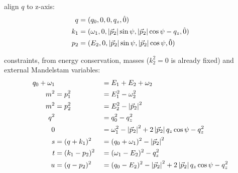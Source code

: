 align $q$ to z-axis:
\begin{align}
q &= (q_0,0,0,q_z,\hat 0)\\
k_1 &= (\omega_1,0,\left|\vec p_2\right|\sin\psi,\left|\vec p_2\right|\cos\psi-q_z, \hat 0)\\
p_2 &= (E_2,0,\left|\vec p_2\right|\sin\psi,\left|\vec p_2\right|\cos\psi, \hat 0)
\end{align}

constraints, from energy conservation, masses ($k_2^2 = 0$ is already fixed) and external Mandelstam variables:
\begin{align}
q_0+\omega_1 & &&=E_1+E_2+\omega_2 \label{eq:PSConIIMomCon}\\
m^2 &= p_1^2 &&= E_1^2 - \omega_2^2 \label{eq:PSConIIp1}\\
m^2 &= p_2^2 &&= E_2^2 - \left|\vec p_2\right|^2 \label{eq:PSConIIp2} \\
q^2 & &&= q_0^2 - q_z^2 \label{eq:PSConIIq}\\
0 & &&= \omega_1^2 - \left|\vec p_2\right|^2 + 2\left|\vec p_2\right|q_z\cos\psi-q_z^2 \label{eq:PSConIIk1}\\
s &= (q+k_1)^2 &&= (q_0+\omega_1)^2 - \left|\vec p_2\right|^2 \label{eq:PSConIIs}\\
t &= (k_1-p_2)^2 &&= (\omega_1-E_2)^2-q_z^2 \label{eq:PSConIIt}\\
u &= (q-p_2)^2 &&= (q_0-E_2)^2 - \left|\vec p_2\right|^2+2\left|\vec p_2\right|q_z\cos\psi - q_z^2 \label{eq:PSConIIu}
\end{align}

